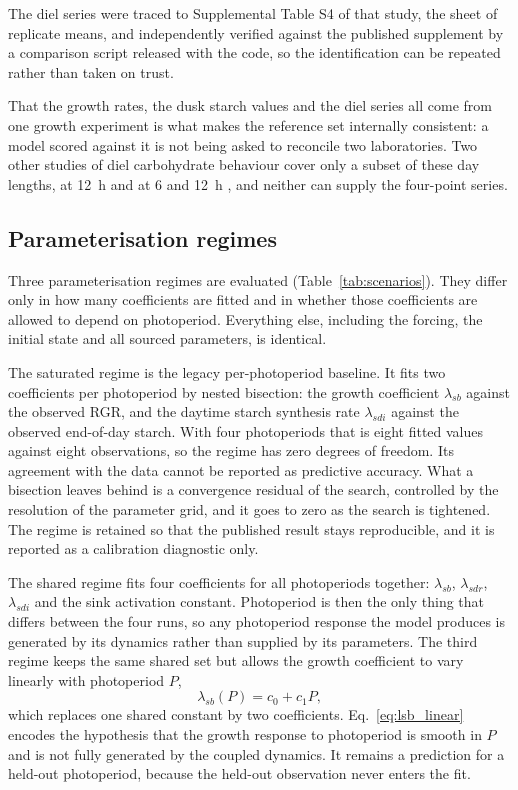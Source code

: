 The diel series were traced to Supplemental Table S4 of that study, the sheet of
replicate means, and independently verified against the published supplement by a
comparison script released with the code, so the identification can be repeated
rather than taken on trust.

That the growth rates, the dusk starch values and the diel series all come from
one growth experiment is what makes the reference set internally consistent: a
model scored against it is not being asked to reconcile two laboratories. Two
other studies of diel carbohydrate behaviour cover only a subset of these day
lengths, at 12~h \citep{Annunziata2017} and at 6 and 12~h \citep{Mengin2017}, and
neither can supply the four-point series.



\subsection{Parameterisation regimes}

Three parameterisation regimes are evaluated (Table~\ref{tab:scenarios}). They
differ only in how many coefficients are fitted and in whether those
coefficients are allowed to depend on photoperiod. Everything else, including
the forcing, the initial state and all sourced parameters, is identical.

The saturated regime is the legacy per-photoperiod baseline. It fits two coefficients per
photoperiod by nested bisection: the growth coefficient $\lambda_{sb}$ against
the observed RGR, and the daytime starch synthesis rate $\lambda_{sdi}$ against
the observed end-of-day starch. With four photoperiods that is eight fitted
values against eight observations, so the regime has zero degrees of freedom.
Its agreement with the data cannot be reported as predictive accuracy. What a
bisection leaves behind is a convergence residual of the search, controlled by
the resolution of the parameter grid, and it goes to zero as the search is
tightened. The regime is retained so that the published result stays
reproducible, and it is reported as a calibration diagnostic only.

The shared regime fits four coefficients for all photoperiods together:
$\lambda_{sb}$, $\lambda_{sdr}$, $\lambda_{sdi}$ and the sink activation
constant. Photoperiod is then the only thing that differs between the four
runs, so any photoperiod response the model produces is generated by its
dynamics rather than supplied by its parameters. The third regime keeps the
same shared set but allows the growth coefficient to vary linearly with
photoperiod $P$,
\begin{equation}
\lambda_{sb}(P) = c_0 + c_1 P ,
\label{eq:lsb_linear}
\end{equation}
which replaces one shared constant by two coefficients. Eq.~\eqref{eq:lsb_linear}
encodes the hypothesis that the growth response to photoperiod is smooth in $P$
and is not fully generated by the coupled dynamics. It remains a prediction for
a held-out photoperiod, because the held-out observation never enters the fit.

